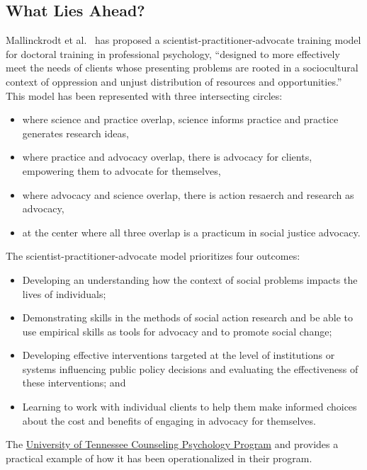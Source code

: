 \documentclass[
  english,
]{book}
\providecommand{\tightlist}{%
  \setlength{\itemsep}{0pt}\setlength{\parskip}{0pt}}
\begin{document}
\hypertarget{what-lies-ahead}{%
\subsection{What Lies Ahead?}\label{what-lies-ahead}}

Mallinckrodt et al.~\citeyearpar{mallinckrodt_scientist-practitioner-advocate_2014} has proposed a scientist-practitioner-advocate training model for doctoral training in professional psychology, ``designed to more effectively meet the needs of clients whose presenting problems are rooted in a sociocultural context of oppression and unjust distribution of resources and opportunities.'' This model has been represented with three intersecting circles:

\begin{itemize}
\tightlist
\item
  where science and practice overlap, science informs practice and practice generates research ideas,
\item
  where practice and advocacy overlap, there is advocacy for clients, empowering them to advocate for themselves,
\item
  where advocacy and science overlap, there is action resaerch and research as advocacy,
\item
  at the center where all three overlap is a practicum in social justice advocacy.
\end{itemize}

The scientist-practitioner-advocate model prioritizes four outcomes:

\begin{itemize}
\tightlist
\item
  Developing an understanding how the context of social problems impacts the lives of individuals;
\item
  Demonstrating skills in the methods of social action research and be able to use empirical skills as tools for advocacy and to promote social change;
\item
  Developing effective interventions targeted at the level of institutions or systems influencing public policy decisions and evaluating the effectiveness of these interventions; and
\item
  Learning to work with individual clients to help them make informed choices about the cost and benefits of engaging in advocacy for themselves.
\end{itemize}

The \href{https://psychology.utk.edu/grad/spa_model.php}{University of Tennessee Counseling Psychology Program} and provides a practical example of how it has been operationalized in their program.
\end{document}
